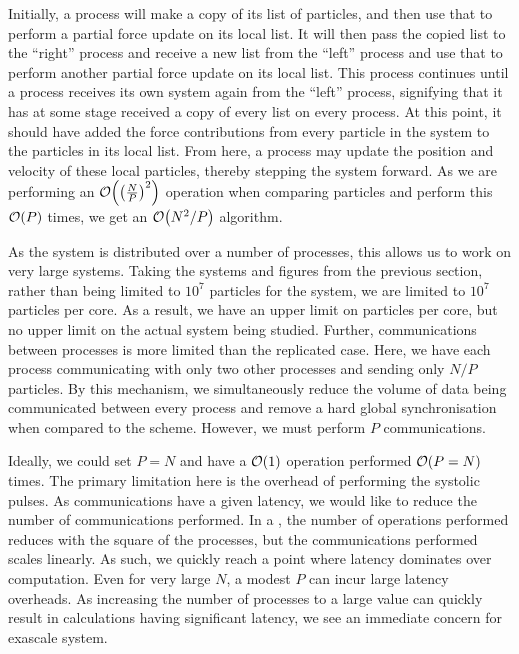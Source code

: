 Initially, a process will make a copy of its list of particles,
and then use that to perform a partial force update on its local list.
%
It will then pass the copied list to the ``right'' process and
receive a new list from the ``left'' process and use that to perform
another partial force update on its local list.
%
This process continues until a process receives its own system again from
the ``left'' process, signifying that it has at some stage received
a copy of every list on every process.
%
At this point, it should have added the force contributions from
every particle in the system to the particles in its local list.
%
From here, a process may update the position and velocity of these local
particles, thereby stepping the system forward.
%
As we are performing an $\mathcal{O}{\left({ \left(\frac{N}{P}\right)^2 }\right)}$ operation
when comparing particles and perform this $\mathcal{O}{\left({ P }\right)}$ times, we
get an $\mathcal{O}{\left({ N^2/P }\right)}$ algorithm.


%
As the system is distributed over a number of processes, this allows
us to work on very large systems.
%
Taking the systems and figures from the previous section,
rather than being limited to $10^7$ particles for the system,
we are limited to $10^7$ particles per core.
%
As a result, we have an upper limit on particles per core, but no
upper limit on the actual system being studied.
%
Further, communications between processes is more limited than the
replicated case.
%
Here, we have each process communicating with only two other processes
and sending only $N/P$ particles.
%
By this mechanism, we simultaneously reduce the volume of data
being communicated between every process and
remove a hard global synchronisation
when compared to the \replicateddata{} scheme.
%
However, we must perform $P$ communications.

Ideally, we could set $P = N$ and have a $\mathcal{O}{\left({ 1 }\right)}$ operation performed
$\mathcal{O}{\left({ P = N }\right)}$ times.
%
The primary limitation here is the overhead of performing the systolic
pulses.
%
As communications have a given latency, we would like to reduce the number
of communications performed.
%
In a \systolicloop{}, the number of operations performed reduces with
the square of the processes, but the communications performed scales linearly.
%
As such, we quickly reach a point where latency dominates over computation.
%
Even for very large $N$, a modest $P$ can incur large latency overheads.
%
As increasing the number of processes to a large value
can quickly result in calculations having significant latency,
we see an immediate concern for exascale system.
